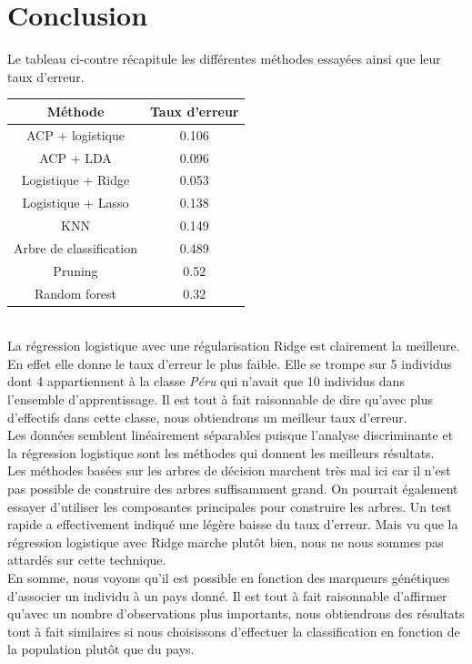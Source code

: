 \documentclass[12pt,a4paper]{article}
\begin{document}
\section{Conclusion}
Le tableau ci-contre récapitule les différentes méthodes essayées ainsi que leur taux d'erreur. \vspace{-4mm}
\begin{center}
	\begin{tabular}{|c|c|}
		\hline
		Méthode & Taux d'erreur \\ \hline
		ACP + logistique & 0.106 \\ \hline
		ACP + LDA & 0.096 \\ \hline
		Logistique + Ridge & 0.053 \\ \hline
		Logistique + Lasso & 0.138 \\ \hline
		KNN & 0.149 \\ \hline
		Arbre de classification & 0.489 \\ \hline
		Pruning & 0.52 \\ \hline
		Random forest & 0.32 \\ \hline
	\end{tabular}
	\label{tab:resume}
\end{center}
~\\
La régression logistique avec une régularisation Ridge est clairement la meilleure. En effet elle donne le taux d'erreur le plus faible. Elle se trompe sur 5 individus dont 4 appartiennent à la classe \textit{Péru} qui n'avait que 10 individus dans l'ensemble d'apprentissage. Il est tout à fait raisonnable de dire qu'avec plus d'effectifs dans cette classe, nous obtiendrons un meilleur taux d'erreur.\vspace{3mm}\\
Les données semblent linéairement séparables puisque l'analyse discriminante et la régression logistique sont les méthodes qui donnent les meilleurs résultats.\\
Les méthodes basées sur les arbres de décision marchent très mal ici car il n'est pas possible de construire des arbres suffisamment grand. On pourrait également essayer d'utiliser les composantes principales pour construire les arbres. Un test rapide a effectivement indiqué une légère baisse du taux d'erreur. Mais vu que la régression logistique avec Ridge marche plutôt bien, nous ne nous sommes pas attardés sur cette technique.\vspace{3mm}\\
En somme, nous voyons qu'il est possible en fonction des marqueurs génétiques d'associer un individu à un pays donné. Il est tout à fait raisonnable d'affirmer qu'avec un nombre d'observations plus importants, nous obtiendrons des résultats tout à fait similaires si nous choisissons d'effectuer la classification en fonction de la population plutôt que du pays.
\end{document}
